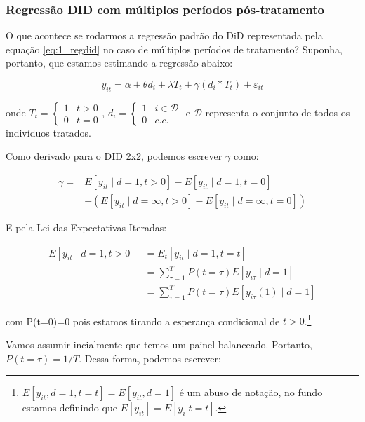 \documentclass[portugues]{article}
\begin{document}
\subsubsection{Regressão DID com múltiplos períodos pós-tratamento}

O que acontece se rodarmos a regressão padrão do DiD representada pela equação \eqref{eq:1_regdid} no caso de múltiplos períodos de tratamento? Suponha, portanto, que estamos estimando a regressão abaixo:

\begin{equation}\label{eq:regdid}
    y_{it} = \alpha + \theta d_i + \lambda T_t + \gamma (d_i*T_t) +  \varepsilon_{it}
\end{equation}

onde $T_t = \begin{cases} 1 & t>0 \\ 0 & t=0 \end{cases}$, $d_i = \begin{cases} 1 & i \in \mathcal{D} \\ 0 & c.c. \end{cases}$ e $\mathcal{D}$ representa o conjunto de todos os indivíduos tratados.

Como derivado para o DID 2x2, podemos escrever $\gamma$ como:

\begin{equation*}
\begin{aligned}
\gamma= & E\left[y_{it} \mid d=1, t > 0\right] - E\left[y_{it} \mid d=1, t=0\right] \\
 & - ( E\left[y_{i t} \mid d=\infty, t > 0 \right] - E\left[y_{i t} \mid d=\infty, t=0\right] )
\end{aligned}
\end{equation*}

E pela Lei das Expectativas Iteradas:

\[
\begin{split}
    E\left[y_{i t} \mid d=1, t > 0\right] &= E_t[y_{it} \mid d=1, t=t] \\
    &= \sum_{\tau=1}^{T} P(t=\tau) E[y_{i\tau} \mid d=1] \\
    &=  \sum_{\tau=1}^{T} P(t=\tau) E[y_{i\tau}(1) \mid d=1]
\end{split}
\]

\noindent com P(t=0)=0 pois estamos tirando a esperança condicional de $t>0$.\footnote{$E[y_{it}, d=1, t=t] = E[y_{it}, d=1]$ é um abuso de notação, no fundo estamos definindo que $E[y_{it}] = E[y_i|t=t]$.} 

Vamos assumir incialmente que temos um painel balanceado. Portanto, $P(t=\tau) = 1/T$. Dessa forma, podemos escrever:
\end{document}
